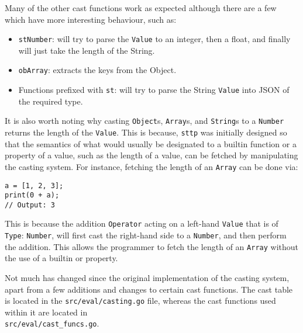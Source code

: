 Many of the other cast functions work as expected although there are a few which have more interesting behaviour, such as:

\begin{itemize}
    \item \verb|stNumber|: will try to parse the \verb|Value| to an integer, then a float, and finally will just take the length of the String.
    \item \verb|obArray|: extracts the keys from the Object.
    \item Functions prefixed with \verb|st|: will try to parse the String \verb|Value| into JSON of the required type.
\end{itemize}

It is also worth noting why casting \verb|Object|s, \verb|Array|s, and \verb|String|s to a \verb|Number| returns the length of the \verb|Value|. This is because, \verb|sttp| was initially designed so that the semantics of what would usually be designated to a builtin function or a property of a value, such as the length of a value, can be fetched by manipulating the casting system. For instance, fetching the length of an \verb|Array| can be done via:

\begin{verbatim}
a = [1, 2, 3];
print(0 + a);
// Output: 3
\end{verbatim}

This is because the addition \verb|Operator| acting on a left-hand \verb|Value| that is of \verb|Type|: \verb|Number|, will first cast the right-hand side to a \verb|Number|, and then perform the addition. This allows the programmer to fetch the length of an \verb|Array| without the use of a builtin or property.

Not much has changed since the original implementation of the casting system, apart from a few additions and changes to certain cast functions. The cast table is located in the \verb|src/eval/casting.go| file, whereas the cast functions used within it are located in \\\verb|src/eval/cast_funcs.go|.
